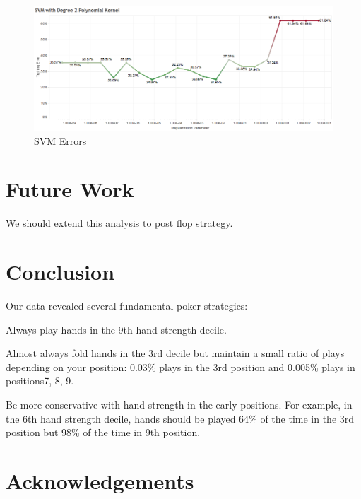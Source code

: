 \documentclass[twoside]{article}
\begin{document}
\begin{multicols}{2}
\begin{figure}[H]
  \centering
  \centerline{\includegraphics[width=1\columnwidth]{SVM.png}}
   \caption{SVM Errors}
  \label{fig:SVM}
\end{figure}


\section{Future Work}

We should extend this analysis to post flop strategy. 


\section{Conclusion}

Our data revealed several fundamental poker strategies:
\begin{compactitem}
\item{} Always play hands in the 9th hand strength decile. 
\item{} Almost always fold hands in the 3rd decile but maintain a small ratio of plays depending on your position: 0.03\% plays in the 3rd position and 0.005\% plays in positions7, 8, 9. 
\item{}Be more conservative with hand strength in the early positions. For example, in the 6th hand strength decile, hands should be played 64\% of the time in the 3rd position but 98\% of the time in 9th position.
\end{compactitem}



\section{Acknowledgements}


\end{multicols}
\end{document}
